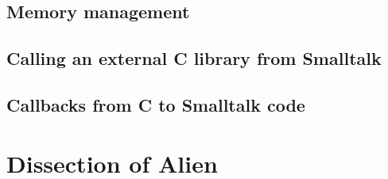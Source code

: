 \documentclass[a4paper,10pt,twoside]{book}
\begin{document}
\subsection{Memory management} \label{sec:memory_management} %


\subsection{Calling an external C library from Smalltalk} \label{sec:calling_an_external_c_library_from_smalltalk} %


\subsection{Callbacks from C to Smalltalk code} \label{sec:callbacks_from_c_to_smalltalk_code} %





\section{Dissection of Alien} \label{sec:dissection_of_alien} %
\end{document}
